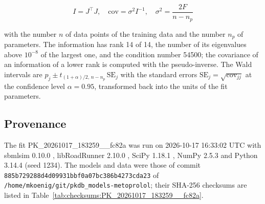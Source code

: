 \documentclass{article}
\begin{document}
\begin{equation}
I = J^\top J, \quad \mathrm{cov} = \sigma^2 I^{-1}, \quad \sigma^2 = \frac{2 F}{n - n_p}
\end{equation}

with the number $n$ of data points of the training data and the number $n_p$ of parameters. The information has rank 14 of 14, the number of its eigenvalues above $10^{-8}$ of the largest one, and the condition number 54500; the covariance of an information of a lower rank is computed with the pseudo-inverse. The Wald intervals are $\hat{p}_j \pm t_{(1+\alpha)/2,\, n-n_p}\, \mathrm{SE}_j$ with the standard errors $\mathrm{SE}_j = \sqrt{\mathrm{cov}_{jj}}$ at the confidence level $\alpha = 0.95$, transformed back into the units of the fit parameters.

\subsection{Provenance}

The fit PK\_20261017\_183259\_\_fc82a was run on 2026-10-17 16:33:02 UTC with sbmlsim 0.10.0 \cite{Koenig2026_sbmlsim}, libRoadRunner 2.10.0 \cite{Welsh2023}, SciPy 1.18.1 \cite{Virtanen2020}, NumPy 2.5.3 \cite{Harris2020} and Python 3.14.4 (seed 1234). The models and data were those of commit \texttt{885b729288d4d09931bbf0a07bc386b4273cda23} of \texttt{/home/mkoenig/git/pkdb\_models-metoprolol}; their SHA-256 checksums are listed in Table~\ref{tab:checksums:PK_20261017_183259__fc82a}.
\end{document}
